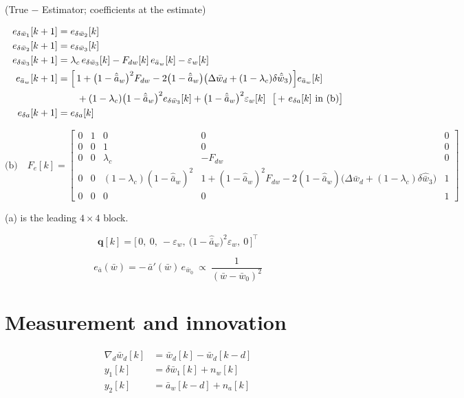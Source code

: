 \documentclass[11pt,a4paper,fontset=none]{ctexart}
\newcommand{\ba}{\bar{a}}
\newcommand{\bw}{\bar{w}}
\begin{document}
(True $-$ Estimator; coefficients at the estimate)

\begin{align*}
e_{\delta\bw_1}[k+1] &= e_{\delta\bw_2}[k] \\
e_{\delta\bw_2}[k+1] &= e_{\delta\bw_3}[k] \\
e_{\delta\bw_3}[k+1] &= \lambda_c\,e_{\delta\bw_3}[k]
  - F_{dw}[k]\,e_{\ba_w}[k] - \varepsilon_w[k] \\
e_{\ba_w}[k+1] &= \Bigl[\,1 + \bigl(1-\hat{\ba}_w\bigr)^{2}F_{dw}
  - 2\bigl(1-\hat{\ba}_w\bigr)
    \bigl(\Delta\bw_d + (1-\lambda_c)\delta\hat{\bw}_3\bigr)\Bigr] e_{\ba_w}[k] \\
  &\qquad + (1-\lambda_c)\bigl(1-\hat{\ba}_w\bigr)^{2} e_{\delta\bw_3}[k]
  + \bigl(1-\hat{\ba}_w\bigr)^{2}\varepsilon_w[k]
  \ \ \bigl[\,+\ e_{\delta a}[k]\ \text{in (b)}\bigr] \\
e_{\delta a}[k+1] &= e_{\delta a}[k]
\end{align*}

\begin{equation*}
\text{(b)}\quad
F_e[k] =
\begin{bmatrix}
0 & 1 & 0 & 0 & 0 \\
0 & 0 & 1 & 0 & 0 \\
0 & 0 & \lambda_c & -F_{dw} & 0 \\
0 & 0 & (1-\lambda_c)(1-\hat{\ba}_w)^{2} &
  1 + (1-\hat{\ba}_w)^{2}F_{dw}
  - 2(1-\hat{\ba}_w)\bigl(\Delta\bw_d + (1-\lambda_c)\delta\hat{\bw}_3\bigr)
  & 1 \\
0 & 0 & 0 & 0 & 1
\end{bmatrix}
\end{equation*}

(a) is the leading $4\times 4$ block.

\begin{equation*}
\mathbf{q}[k] = \bigl[\,0,\ 0,\ -\varepsilon_w,\
\bigl(1-\hat{\ba}_w\bigr)^{2}\varepsilon_w,\ 0\,\bigr]^{\top}
\end{equation*}

\begin{equation*}
e_{\ba}(\bw) = -\,\ba'(\bw)\,e_{\bw_0}
\ \propto\ \frac{1}{(\bw-\bw_0)^{2}}
\end{equation*}

\section{Measurement and innovation}

\begin{align*}
\nabla_d\bw_d[k] &= \bw_d[k] - \bw_d[k-d] \\
y_1[k] &= \delta\bw_1[k] + n_w[k] \\
y_2[k] &= \ba_w[k-d] + n_a[k]
\end{align*}
\end{document}
